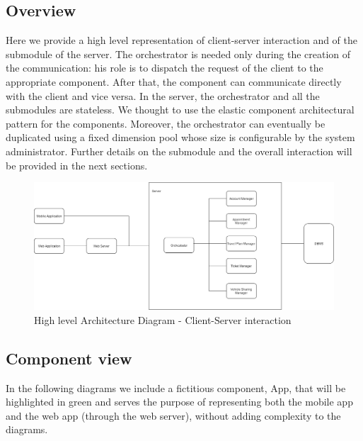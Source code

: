 \subsection{Overview}
	Here we provide a high level representation of client-server interaction and of the submodule of the server.
	The orchestrator is needed only during the creation of the communication: his role is to dispatch the request of the client to the appropriate component. After that, the component can communicate directly with the client and vice versa.\newline
	In the server, the orchestrator and all the submodules are stateless. We thought to use the elastic component architectural pattern for the components. Moreover, the orchestrator can eventually be duplicated using a fixed dimension pool whose size is configurable by the system administrator.\newline
	Further details on the submodule and the overall interaction will be provided in the next sections.

	\begin{figure}[H]
		\centerline{\includegraphics[width=0.9\paperwidth]{Images/HighLevelArchitecture}}
		\caption{High level Architecture Diagram - Client-Server interaction}
	\end{figure}
\subsection{Component view}
	In the following diagrams we include a fictitious component, App, that will be highlighted in green and serves the purpose of representing both the mobile app and the web app (through the web server), without adding complexity to the diagrams.
